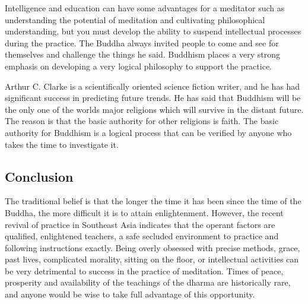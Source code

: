 \documentclass[a5paper,10pt,english]{book}
\begin{document}
\sphinxAtStartPar
Intelligence and education can have some advantages for a meditator such
as understanding the potential of meditation and cultivating
philosophical understanding, but you must develop the ability to suspend
intellectual processes during the practice. The Buddha always invited
people to come and see for themselves and challenge the things he said.
Buddhism places a very strong emphasis on developing a very logical
philosophy to support the practice.

\sphinxAtStartPar
Arthur C. Clarke is a scientifically oriented science fiction writer,
and he has had significant success in predicting future trends. He has
said that Buddhism will be the only one of the worlds major religions
which will survive in the distant future. The reason is that the basic
authority for other religions is faith. The basic authority for Buddhism
is a logical process that can be verified by anyone who takes the time
to investigate it.


\subsection{Conclusion}
\label{\detokenize{saints:id1}}
\sphinxAtStartPar
The traditional belief is that the longer the time it has been since the
time of the Buddha, the more difficult it is to attain enlightenment.
However, the recent revival of practice in Southeast Asia indicates that
the operant factors are qualified, enlightened teachers, a safe secluded
environment to practice and following instructions exactly. Being overly
obsessed with precise methods, grace, past lives, complicated morality,
sitting on the floor, or intellectual activities can be very detrimental
to success in the practice of meditation. Times of peace, prosperity and
availability of the teachings of the dharma are historically rare, and
anyone would be wise to take full advantage of this opportunity.
\end{document}
